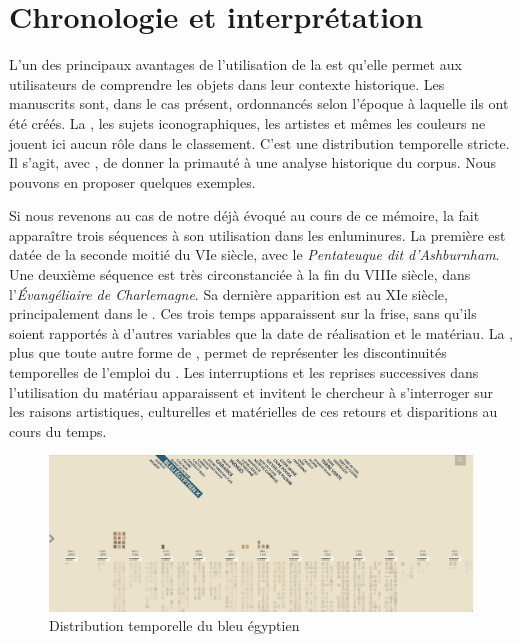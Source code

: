 \section{Chronologie et interprétation}

L'un des principaux avantages de l'utilisation de la  est qu'elle permet aux utilisateurs de comprendre les objets dans leur contexte historique. Les manuscrits sont, dans le cas présent, ordonnancés selon l’époque à laquelle ils ont été créés. La , les sujets iconographiques, les artistes et mêmes les couleurs ne jouent ici aucun rôle dans le classement. C’est une distribution temporelle stricte. Il s’agit, avec , de donner la primauté à une analyse historique du corpus. Nous pouvons en proposer quelques exemples.\par
Si nous revenons au cas de notre  déjà évoqué au cours de ce mémoire, la  fait apparaître trois séquences à son utilisation dans les enluminures. La première est datée de la seconde moitié du VIe siècle, avec le \textit{Pentateuque dit d’Ashburnham}. Une deuxième séquence est très circonstanciée à la fin du VIIIe siècle, dans l’\textit{Évangéliaire de Charlemagne}. Sa dernière apparition est au XIe siècle, principalement dans le \textit{}. Ces trois temps apparaissent sur la frise, sans qu’ils soient rapportés à d’autres variables que la date de réalisation et le matériau. La , plus que toute autre forme de , permet de représenter les discontinuités temporelles de l’emploi du . Les interruptions et les reprises successives dans l’utilisation du matériau apparaissent et invitent le chercheur à s’interroger sur les raisons artistiques, culturelles et matérielles de ces retours et disparitions au cours du temps.\par

\begin{figure}[H]
	\centering
	\includegraphics[width=\textwidth]{./textes/chap3/vikus-bleu-egy.jpg}
	\caption{Distribution temporelle du bleu égyptien}
	\label{fig:info}
\end{figure}

